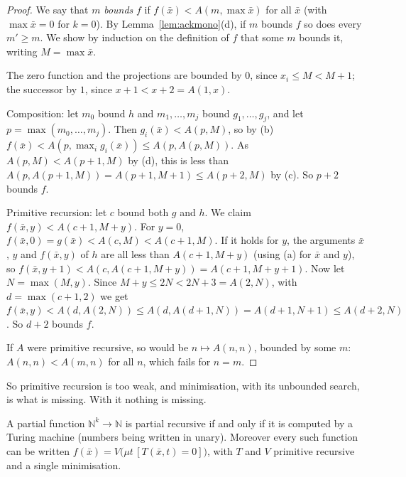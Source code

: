 \begin{proof}
We say that $m$ \emph{bounds} $f$ if $f(\bar x)<A(m,\max\bar x)$ for all $\bar x$ (with $\max\bar x=0$ for $k=0$). By Lemma~\ref{lem:ackmono}(d), if $m$ bounds $f$ so does every $m'\ge m$. We show by induction on the definition of $f$ that some $m$ bounds it, writing $M=\max\bar x$.

The zero function and the projections are bounded by $0$, since $x_i\le M<M+1$; the successor by $1$, since $x+1<x+2=A(1,x)$.

Composition: let $m_0$ bound $h$ and $m_1,\dots,m_j$ bound $g_1,\dots,g_j$, and let $p=\max(m_0,\dots,m_j)$. Then $g_i(\bar x)<A(p,M)$, so by (b) $f(\bar x)<A(p,\max_ig_i(\bar x))\le A(p,A(p,M))$. As $A(p,M)<A(p+1,M)$ by (d), this is less than $A(p,A(p+1,M))=A(p+1,M+1)\le A(p+2,M)$ by (c). So $p+2$ bounds $f$.

Primitive recursion: let $c$ bound both $g$ and $h$. We claim $f(\bar x,y)<A(c+1,M+y)$. For $y=0$, $f(\bar x,0)=g(\bar x)<A(c,M)<A(c+1,M)$. If it holds for $y$, the arguments $\bar x$, $y$ and $f(\bar x,y)$ of $h$ are all less than $A(c+1,M+y)$ (using (a) for $\bar x$ and $y$), so $f(\bar x,y+1)<A(c,A(c+1,M+y))=A(c+1,M+y+1)$. Now let $N=\max(M,y)$. Since $M+y\le2N<2N+3=A(2,N)$, with $d=\max(c+1,2)$ we get $f(\bar x,y)<A(d,A(2,N))\le A(d,A(d+1,N))=A(d+1,N+1)\le A(d+2,N)$. So $d+2$ bounds $f$.

If $A$ were primitive recursive, so would be $n\mapsto A(n,n)$, bounded by some $m$: $A(n,n)<A(m,n)$ for all $n$, which fails for $n=m$.
\end{proof}

So primitive recursion is too weak, and minimisation, with its unbounded search, is what is missing. With it nothing is missing.

\begin{theorem}[Kleene]\label{thm:kleenenf}
A partial function $\mathbb N^k\to\mathbb N$ is partial recursive if and only if it is computed by a Turing machine (numbers being written in unary). Moreover every such function can be written $f(\bar x)=V\bigl(\mu t\,[T(\bar x,t)=0]\bigr)$, with $T$ and $V$ primitive recursive and a single minimisation.
\end{theorem}

